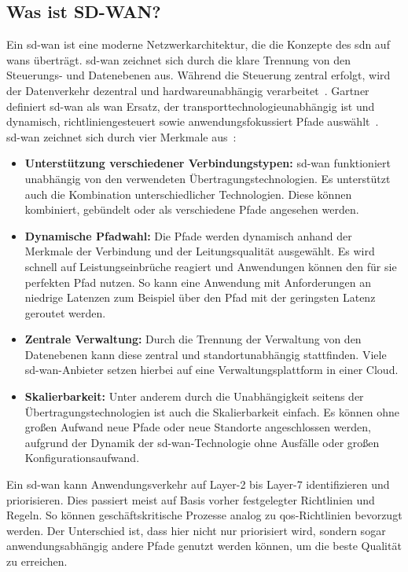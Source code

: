 
\subsection*{Was ist SD-WAN?}
Ein \acl{sd-wan} ist eine moderne Netzwerkarchitektur, die die Konzepte des \ac{sdn} auf \acp{wan} überträgt. \ac{sd-wan} zeichnet sich durch die klare Trennung von den Steuerungs- und Datenebenen aus. Während die Steuerung zentral erfolgt, wird der Datenverkehr dezentral und hardwareunabhängig verarbeitet~\cite{WasIstSDWAN}. Gartner definiert \ac{sd-wan} als \ac{wan} Ersatz, der transporttechnologieunabhängig ist und dynamisch, richtliniengesteuert sowie anwendungsfokussiert Pfade auswählt~\cite{DefinitionSoftwareDefinedWAN}.\\
\ac{sd-wan} zeichnet sich durch vier Merkmale aus~\cite{WasIstSDWAN}:
\begin{itemize}
	\item \textbf{Unterstützung verschiedener Verbindungstypen:} \ac{sd-wan} funktioniert unabhängig von den verwendeten Übertragungstechnologien. Es unterstützt auch die Kombination unterschiedlicher Technologien. Diese können kombiniert, gebündelt oder als verschiedene Pfade angesehen werden.
	\item \textbf{Dynamische Pfadwahl:} Die Pfade werden dynamisch anhand der Merkmale der Verbindung und der Leitungsqualität ausgewählt. Es wird schnell auf Leistungseinbrüche reagiert und Anwendungen können den für sie perfekten Pfad nutzen. So kann eine Anwendung mit Anforderungen an niedrige Latenzen zum Beispiel über den Pfad mit der geringsten Latenz geroutet werden.
	\item \textbf{Zentrale Verwaltung:} Durch die Trennung der Verwaltung von den Datenebenen kann diese zentral und standortunabhängig stattfinden. Viele \ac{sd-wan}-Anbieter setzen hierbei auf eine Verwaltungsplattform in einer Cloud.
	\item \textbf{Skalierbarkeit:} Unter anderem durch die Unabhängigkeit seitens der Übertragungstechnologien ist auch die Skalierbarkeit einfach. Es können ohne großen Aufwand neue Pfade oder neue Standorte angeschlossen werden, aufgrund der Dynamik der \ac{sd-wan}-Technologie ohne Ausfälle oder großen Konfigurationsaufwand.
\end{itemize}

Ein \ac{sd-wan} kann Anwendungsverkehr auf Layer-2 bis Layer-7 identifizieren und priorisieren. Dies passiert meist auf Basis vorher festgelegter Richtlinien und Regeln. So können geschäftskritische Prozesse analog zu \ac{qos}-Richtlinien bevorzugt werden. Der Unterschied ist, dass hier nicht nur priorisiert wird, sondern sogar anwendungsabhängig andere Pfade genutzt werden können, um die beste Qualität zu erreichen.

